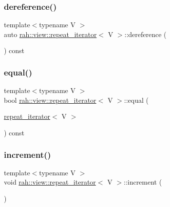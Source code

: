 \subsubsection{\texorpdfstring{dereference()}{dereference()}}
{\footnotesize\ttfamily template$<$typename V $>$ \\
auto \mbox{\hyperlink{structrah_1_1view_1_1repeat__iterator}{rah\+::view\+::repeat\+\_\+iterator}}$<$ V $>$\+::dereference (\begin{DoxyParamCaption}{ }\end{DoxyParamCaption}) const\hspace{0.3cm}{\ttfamily [inline]}}

\mbox{\label{structrah_1_1view_1_1repeat__iterator_ab42103684163bf38275999ff908d3113}} 
\subsubsection{\texorpdfstring{equal()}{equal()}}
{\footnotesize\ttfamily template$<$typename V $>$ \\
bool \mbox{\hyperlink{structrah_1_1view_1_1repeat__iterator}{rah\+::view\+::repeat\+\_\+iterator}}$<$ V $>$\+::equal (\begin{DoxyParamCaption}\item[{\mbox{\hyperlink{structrah_1_1view_1_1repeat__iterator}{repeat\+\_\+iterator}}$<$ V $>$}]{ }\end{DoxyParamCaption}) const\hspace{0.3cm}{\ttfamily [inline]}}

\mbox{\label{structrah_1_1view_1_1repeat__iterator_a5556f69de4c759f4fec42c12d70ea869}} 
\subsubsection{\texorpdfstring{increment()}{increment()}}
{\footnotesize\ttfamily template$<$typename V $>$ \\
void \mbox{\hyperlink{structrah_1_1view_1_1repeat__iterator}{rah\+::view\+::repeat\+\_\+iterator}}$<$ V $>$\+::increment (\begin{DoxyParamCaption}{ }\end{DoxyParamCaption})\hspace{0.3cm}{\ttfamily [inline]}}




